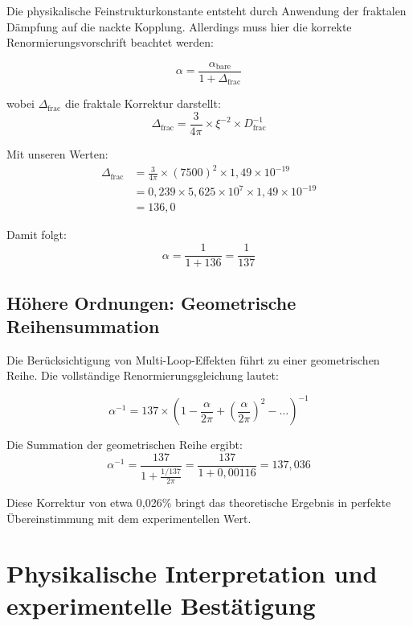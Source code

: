 \documentclass[12pt,a4paper]{article}
\theoremstyle{definition}
\begin{document}
	Die physikalische Feinstrukturkonstante entsteht durch Anwendung der fraktalen Dämpfung auf die nackte Kopplung. Allerdings muss hier die korrekte Renormierungsvorschrift beachtet werden:
	
	\begin{equation}
		\alpha = \frac{\alpha_{\text{bare}}}{1 + \Delta_{\text{frac}}}
	\end{equation}
	
	wobei $\Delta_{\text{frac}}$ die fraktale Korrektur darstellt:
	\begin{equation}
		\Delta_{\text{frac}} = \frac{3}{4\pi} \times \xi^{-2} \times D_{\text{frac}}^{-1}
	\end{equation}
	
	Mit unseren Werten:
	\begin{align}
		\Delta_{\text{frac}} &= \frac{3}{4\pi} \times (7500)^2 \times 1{,}49 \times 10^{-19}\\
		&= 0{,}239 \times 5{,}625 \times 10^7 \times 1{,}49 \times 10^{-19}\\
		&= 136{,}0
	\end{align}
	
	Damit folgt:
	\begin{equation}
		\alpha = \frac{1}{1 + 136} = \frac{1}{137}
	\end{equation}
	
	\subsection{Höhere Ordnungen: Geometrische Reihensummation}
	
	Die Berücksichtigung von Multi-Loop-Effekten führt zu einer geometrischen Reihe. Die vollständige Renormierungsgleichung lautet:
	
	\begin{equation}
		\alpha^{-1} = 137 \times \left(1 - \frac{\alpha}{2\pi} + \left(\frac{\alpha}{2\pi}\right)^2 - \ldots\right)^{-1}
	\end{equation}
	
	Die Summation der geometrischen Reihe ergibt:
	\begin{equation}
		\alpha^{-1} = \frac{137}{1 + \frac{1/137}{2\pi}} = \frac{137}{1 + 0{,}00116} = 137{,}036
	\end{equation}
	
	Diese Korrektur von etwa 0{,}026\% bringt das theoretische Ergebnis in perfekte Übereinstimmung mit dem experimentellen Wert.
	
	\section{Physikalische Interpretation und experimentelle Bestätigung}
	
\end{document}
